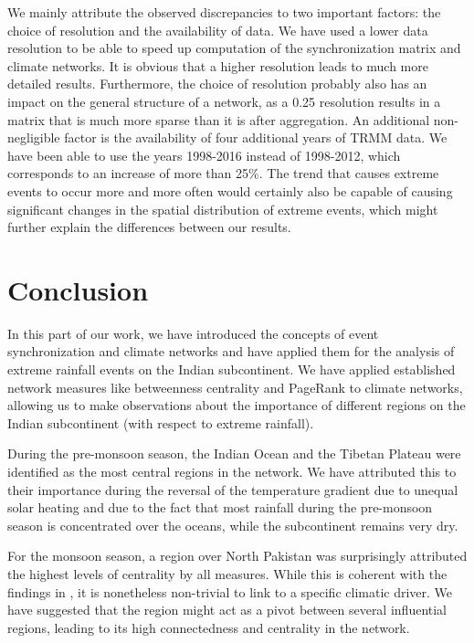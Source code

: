 We mainly attribute the observed discrepancies to two important factors: the choice of resolution and the availability of data. We have used a lower data resolution to be able to speed up computation of the synchronization matrix and climate networks. It is obvious that a higher resolution leads to much more detailed results. Furthermore, the choice of resolution probably also has an impact on the general structure of a network, as a {0.25\degree} resolution results in a matrix that is much more sparse than it is after aggregation. An additional non-negligible factor is the availability of four additional years of TRMM data. We have been able to use the years 1998-2016 instead of 1998-2012, which corresponds to an increase of more than 25\%. The trend that causes extreme events to occur more and more often would certainly also be capable of causing significant changes in the spatial distribution of extreme events, which might further explain the differences between our results.

\section{Conclusion}
\label{st:event_sync_conclusion}
In this part of our work, we have introduced the concepts of event synchronization and climate networks and have applied them for the analysis of extreme rainfall events on the Indian subcontinent. We have applied established network measures like betweenness centrality and PageRank to climate networks, allowing us to make observations about the importance of different regions on the Indian subcontinent (with respect to extreme rainfall).

During the pre-monsoon season, the Indian Ocean and the Tibetan Plateau were identified as the most central regions in the network. We have attributed this to their importance during the reversal of the temperature gradient due to unequal solar heating and due to the fact that most rainfall during the pre-monsoon season is concentrated over the oceans, while the subcontinent remains very dry.

For the monsoon season, a region over North Pakistan was surprisingly attributed the highest levels of centrality by all measures. While this is coherent with the findings in \citet{Stolbova.2015}, it is nonetheless non-trivial to link to a specific climatic driver. We have suggested that the region might act as a pivot between several influential regions, leading to its high connectedness and centrality in the network.

